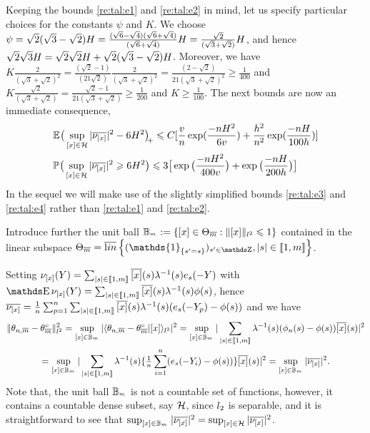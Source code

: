 \begin{rmk}\label{rem:re:tal1}
Keeping the bounds  \eqref{re:tal:e1} and \eqref{re:tal:e2} in mind, let us
specify particular choices for the constants $\psi$ and $K$. We
choose
$\psi=\sqrt{2}(\sqrt{3}-\sqrt{2})\TcH=\tfrac{(\sqrt{6}-\sqrt{4})(\sqrt{6}+\sqrt{4})}{(\sqrt{6}+\sqrt{4})}\TcH=\tfrac{\sqrt{2}}{(\sqrt{3}+\sqrt{2})}\TcH$,
and hence
$\sqrt{2}\sqrt{3}\TcH=\sqrt{2}\sqrt{2}\TcH+\sqrt{2}(\sqrt{3}-\sqrt{2})\TcH$. Moreover,
 we have
$K\tfrac{2}{(\sqrt{3}+\sqrt{2})^2}=\tfrac{(\sqrt{2}-1)}{(21\sqrt{2})}\tfrac{2}{(\sqrt{3}+\sqrt{2})^2}=\tfrac{(2-\sqrt{2})}{21(\sqrt{3}+\sqrt{2})^2}\geq\tfrac{1}{400}$
and
$K\tfrac{\sqrt{2}}{(\sqrt{3}+\sqrt{2})}=\tfrac{\sqrt{2}-1}{21(\sqrt{3}+\sqrt{2})}\geq\tfrac{1}{200}$
and $K\geq \tfrac{1}{100}$.
The next bounds are now an immediate consequence, 
\begin{align}
	 &\Ex\vectp{\sup_{\He\in\cH}|\overline{\nu_{\He}}|^2-6\TcH^2}\leq C [\frac{\Tcv}{n}\exp(\frac{-n\TcH^2}{6\Tcv})+\frac{\Tch^2}{n^2}\exp(\frac{-n \TcH}{100\Tch}) ]\label{re:tal:e3} \\
	&\pM\big(\sup_{\He\in\cH}|\overline{\nu_{\He}}|^2\geq6\TcH^2\big)\leq 3\big[\exp\big(\frac{-n\TcH^2}{400\Tcv}\big)+\exp\big(\frac{-n\TcH}{200\Tch}\big)\big]\label{re:tal:e4}
\end{align}
In the sequel we will make use of the slightly simplified bounds \eqref{re:tal:e3} and
\eqref{re:tal:e4} rather than \eqref{re:tal:e1} and \eqref{re:tal:e2}.
\remEnd
\end{rmk}
\begin{rmk}\label{rem:re:tal2} Introduce further the unit ball $\mBaH:=\set{\He\in\mHiH:\Vnormlp{\He}\leq1}$
 contained in the linear subspace
 $\mHiH=\lin\set{(\mathds{1}_{\{s' = s\}})_{s' \in \Z},|s|\in\nset{1,\Di}}$.
 
 Setting $\nu_{\He}(\rY)=\sum_{|s|\in\nset{1,\Di}}\ofHe{(s)}\fedfI[(s)]\bas_s(-\rY)$ with
 $\E\nu_{\He}(\rY)=\sum_{|s|\in\nset{1,\Di}}\ofHe{(s)}\fedfI[(s)]\fydf[(s)]$,
 hence $\overline{\nu_{\He}}=\tfrac{1}{\ssY}\sum_{p=1}^{\ssY}\sum_{|s|\in\nset{1,\Di}}\ofHe{(s)}\fedfI[(s)](\bas_s(-\rY_p)-\fydf[(s)])$ and we have
\begin{multline*}
	\Vnormlp{\txdfPr-\xdfPr}^2=\sup_{\He\in\mBaH}|\Vskalarlp{\txdfPr-\xdfPr\vert \He}|^2=\sup_{\He\in\mBaH}|\sum_{|s|\in\nset{1,\Di}}\fedfI[(s)](\hfydf[(s)]-\fydf[(s)])\ofHe{(s)}|^2\\
=\sup_{\He\in\mBaH}|\sum_{|s|\in\nset{1,\Di}}\fedfI[(s)]\{\tfrac{1}{\ssY}\sum_{i=1}^{\ssY}(\bas_s(-\rY_i)-\fydf[(s)])\}\ofHe{(s)}|^2
=\sup_{\He\in\mBaH}|\overline{\nu_{\He}}|^2.
\end{multline*}
Note that, the unit ball $\mBaH$ is not a countable set of functions, however, it contains a countable dense subset, say $\cH$, since $\lp[2]$ is separable, and it is straightforward to see that $\sup_{\He\in\mBaH}|\overline{\nu_{\He}}|^2=\sup_{\He\in\cH}|\overline{\nu_{\He}}|^2$.
\remEnd
\end{rmk}

